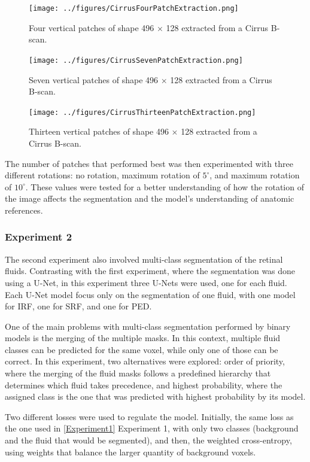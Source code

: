 \begin{figure}[!ht]
	\centering
	\texttt{[image: ../figures/CirrusFourPatchExtraction.png]}
	\caption{Four vertical patches of shape 496 $\times$ 128 extracted from a Cirrus B-scan.}
	\label{fig:CirrusFourPatchExtraction}
\end{figure}

\begin{figure}[!ht]
	\centering
	\texttt{[image: ../figures/CirrusSevenPatchExtraction.png]}
	\caption{Seven vertical patches of shape 496 $\times$ 128 extracted from a Cirrus B-scan.}
	\label{fig:CirrusSevenPatchExtraction}
\end{figure}


\begin{figure}[!ht]
	\centering
	\texttt{[image: ../figures/CirrusThirteenPatchExtraction.png]}
	\caption{Thirteen vertical patches of shape 496 $\times$ 128 extracted from a Cirrus B-scan.}
	\label{fig:CirrusThirteenPatchExtraction}
\end{figure}

The number of patches that performed best was then experimented with three different rotations: no rotation, maximum rotation of $5^{\circ}$, and maximum rotation of $10^{\circ}$. These values were tested for a better understanding of how the rotation of the image affects the segmentation and the model's understanding of anatomic references.

\subsubsection{Experiment 2}\label{Experiment2}
The second experiment also involved multi-class segmentation of the retinal fluids. Contrasting with the first experiment, where the segmentation was done using a U-Net, in this experiment three U-Nets were used, one for each fluid. Each U-Net model focus only on the segmentation of one fluid, with one model for IRF, one for SRF, and one for PED.
\par
One of the main problems with multi-class segmentation performed by binary models is the merging of the multiple masks. In this context, multiple fluid classes can be predicted for the same voxel, while only one of those can be correct. In this experiment, two alternatives were explored: order of priority, where the merging of the fluid masks follows a predefined hierarchy that determines which fluid takes precedence, and highest probability, where the assigned class is the one that was predicted with highest probability by its model.
\par
Two different losses were used to regulate the model. Initially, the same loss as the one used in \ref{Experiment1} Experiment 1, with only two classes (background and the fluid that would be segmented), and then, the weighted cross-entropy, using weights that balance the larger quantity of background voxels.

